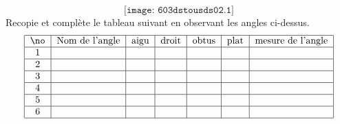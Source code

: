 \[\texttt{[image: 603dstousds02.1]}\]
Recopie et complète le tableau suivant en observant les angles
ci-dessus.
\[\begin{tabular}{|c|c|c|c|c|c|c|}
\hline
\no&Nom de l'angle&aigu&droit&obtus&plat&mesure de l'angle\\
\hline
1&&&&&&\\
\hline
2&&&&&&\\
\hline
3&&&&&&\\
\hline
4&&&&&&\\
\hline
5&&&&&&\\
\hline
6&&&&&&\\
\hline
\end{tabular}
\]